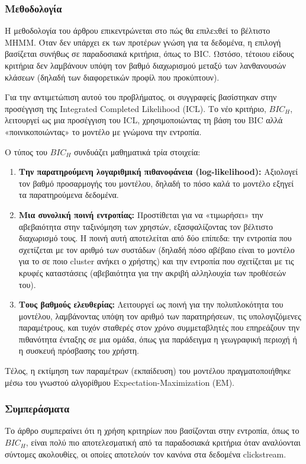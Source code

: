 \documentclass[12pt,a4paper]{article}
\begin{document}
	\subsubsection{Μεθοδολογία}
	Η μεθοδολογία του άρθρου επικεντρώνεται στο πώς θα επιλεxθεί το βέλτιστο MHMM. Όταν δεν υπάρχει εκ των προτέρων γνώση για τα δεδομένα, η επιλογή βασίζεται συνήθως σε παραδοσιακά κριτήρια, όπως το BIC. Ωστόσο, τέτοιου είδους κριτήρια δεν λαμβάνουν υπόψη τον βαθμό διαχωρισμού μεταξύ των λανθανουσών κλάσεων (δηλαδή των διαφορετικών προφίλ που προκύπτουν).
	
	Για την αντιμετώπιση αυτού του προβλήματος, οι συγγραφείς βασίστηκαν στην προσέγγιση της Integrated Completed Likelihood (ICL). Το νέο κριτήριο, $BIC_H$, λειτουργεί ως μια προσέγγιση του ICL, χρησιμοποιώντας τη βάση του BIC αλλά «ποινικοποιώντας» το μοντέλο με γνώμονα την εντροπία. 
	
	Ο τύπος του $BIC_H$ συνδυάζει μαθηματικά τρία στοιχεία:
	\begin{enumerate}
		\item \textbf{Την παρατηρούμενη λογαριθμική πιθανοφάνεια (log-likelihood):} Αξιολογεί τον βαθμό προσαρμογής του μοντέλου, δηλαδή το πόσο καλά το μοντέλο εξηγεί τα παρατηρούμενα δεδομένα.
		\item \textbf{Μια συνολική ποινή εντροπίας:} Προστίθεται για να «τιμωρήσει» την αβεβαιότητα στην ταξινόμηση των χρηστών, εξασφαλίζοντας τον βέλτιστο διαχωρισμό τους. Η ποινή αυτή αποτελείται από δύο επίπεδα: την εντροπία που σχετίζεται με τον αριθμό των συστάδων (δηλαδή πόσο αβέβαιο είναι το μοντέλο για το σε ποιο cluster ανήκει ο χρήστης) και την εντροπία που σχετίζεται με τις κρυφές καταστάσεις (αβεβαιότητα για την ακριβή αλληλουχία των προθέσεών του).
		\item \textbf{Τους βαθμούς ελευθερίας:} Λειτουργεί ως ποινή για την πολυπλοκότητα του μοντέλου, λαμβάνοντας υπόψη τον αριθμό των παρατηρήσεων, τις υπολογιζόμενες παραμέτρους, και τυχόν σταθερές στον χρόνο συμμεταβλητές που επηρεάζουν την πιθανότητα ένταξης σε μια ομάδα, όπως για παράδειγμα η γεωγραφική περιοχή ή η συσκευή πρόσβασης του χρήστη.
	\end{enumerate}
	
	Τέλος, η εκτίμηση των παραμέτρων (εκπαίδευση) του μοντέλου πραγματοποιήθηκε μέσω του γνωστού αλγορίθμου Expectation-Maximization (EM).
	
	\subsubsection{Συμπεράσματα}
	Το άρθρο συμπεραίνει ότι η χρήση κριτηρίων που βασίζονται στην εντροπία, όπως το $BIC_H$, είναι πολύ πιο αποτελεσματική από τα παραδοσιακά κριτήρια όταν αναλύονται σύντομες ακολουθίες, οι οποίες αποτελούν τον κανόνα στα δεδομένα clickstream. 
	
\end{document}
